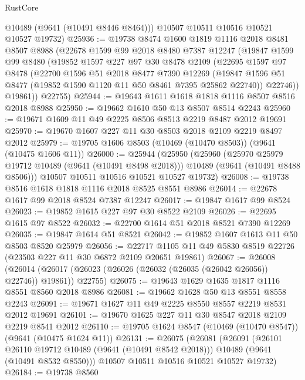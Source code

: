 \begin{lexlean}{RustCore}
\begin{coremodule}
        @10489
        (@9641 (@10491 @8446 @8464)))
      @10507
      @10511
      @10516
      @10521
      @10527
      @19732)
@25936 := @19738
    @8474
    @1600
    @1819
    @1116
    @2018
    @8481
    @8507
    @8988
    (@22678
      @1599
      @99
      @2018
      @8480
      @7387
      @12247
      (@19847
        @1599
        @99
        @8480
        (@19852
          @1597
          @227
          @97
          @30
          @8478
          @2109
          (@22695
            @1597
            @97
            @8478
            (@22700
              @1596
              @51
              @2018
              @8477
              @7390
              @12269
              (@19847 @1596 @51 @8477 (@19852 @1590 @1120 @11 @50 @8461 @7395 @25862 @22740))
              @22746))
          @19861))
      @22755)
@25944 := @19643 @1611 @1618 @1818 @1116 @8507 @8516 @2018 @8988
@25950 := @19662 @1610 @50 @13 @8507 @8514 @2243
@25960 := @19671 @1609 @11 @49 @2225 @8506 @8513 @2219 @8487 @2012 @19691
@25970 := @19670 @1607 @227 @11 @30 @8503 @2018 @2109 @2219 @8497 @2012
@25979 := @19705 @1606 @8503 (@10469 (@10470 @8503)) (@9641 (@10475 @1606 @11))
@26000 := @25944
    (@25950
      (@25960
        (@25970 @25979 @19712 @10489 (@9641 (@10491 @8498 @2018)))
        @10489
        (@9641 (@10491 @8488 @8506)))
      @10507
      @10511
      @10516
      @10521
      @10527
      @19732)
@26008 := @19738 @8516 @1618 @1818 @1116 @2018 @8525 @8551 @8986
@26014 := @22678 @1617 @99 @2018 @8524 @7387 @12247
@26017 := @19847 @1617 @99 @8524
@26023 := @19852 @1615 @227 @97 @30 @8522 @2109
@26026 := @22695 @1615 @97 @8522
@26032 := @22700 @1614 @51 @2018 @8521 @7390 @12269
@26035 := @19847 @1614 @51 @8521
@26042 := @19852 @1607 @1613 @11 @50 @8503 @8520 @25979
@26056 := @22717 @1105 @11 @49 @5830 @8519 @22726 (@23503 @227 @11 @30 @6872 @2109 @20651 @19861)
@26067 := @26008
    (@26014 (@26017 (@26023 (@26026 (@26032 (@26035 (@26042 @26056)) @22746)) @19861)) @22755)
@26075 := @19643 @1629 @1635 @1817 @1116 @8551 @8560 @2018 @8986
@26081 := @19662 @1628 @50 @13 @8551 @8558 @2243
@26091 := @19671 @1627 @11 @49 @2225 @8550 @8557 @2219 @8531 @2012 @19691
@26101 := @19670 @1625 @227 @11 @30 @8547 @2018 @2109 @2219 @8541 @2012
@26110 := @19705 @1624 @8547 (@10469 (@10470 @8547)) (@9641 (@10475 @1624 @11))
@26131 := @26075
    (@26081
      (@26091
        (@26101 @26110 @19712 @10489 (@9641 (@10491 @8542 @2018)))
        @10489
        (@9641 (@10491 @8532 @8550)))
      @10507
      @10511
      @10516
      @10521
      @10527
      @19732)
@26184 := @19738
    @8560

\end{coremodule}
\end{lexlean}
